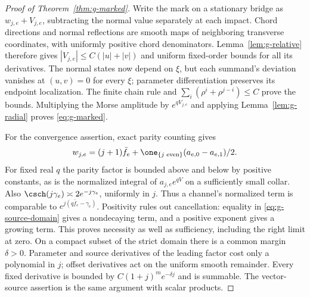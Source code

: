 \begin{proof}[Proof of Theorem~\ref{thm:g-marked}]
Write the mark on a stationary bridge as $w_{j,e}+V_{j,e}$, subtracting
the normal value separately at each impact. Chord directions and normal
reflections are smooth maps of neighboring transverse coordinates, with
uniformly positive chord denominators. Lemma~\ref{lem:g-relative}
therefore gives $|V_{j,e}|\le C(|u|+|v|)$ and uniform fixed-order
bounds for all its derivatives. The normal states now depend on $\xi$,
but each summand's deviation vanishes at $(u,v)=0$ for every $\xi$;
parameter differentiation preserves its endpoint localization.
The finite chain rule and $\sum_i(\rho^i+\rho^{j-i})\le C$ prove
the bounds. Multiplying the Morse amplitude by $e^{qV_{j,e}}$ and
applying Lemma~\ref{lem:g-radial} proves \eqref{eq:g-marked}.

For the convergence assertion, exact parity counting gives
\begin{equation}\label{eq:g-parity}
 w_{j,e}=(j+1)\bar f_e+
       \one_{\{j\text{ even}\}}(a_{e,0}-a_{e,1})/2.
\end{equation}
For fixed real $q$ the parity factor is bounded above and below by
positive constants, as is the normalized integral of $a_{j,e}e^{qV}$
on a sufficiently small collar. Also $\csch(j\gamma_e)\asymp
2e^{-j\gamma_e}$, uniformly in $j$. Thus a channel's normalized term
is comparable to $e^{j(q\bar f_e-\gamma_e)}$. Positivity rules out
cancellation: equality in \eqref{eq:g-source-domain} gives a
nondecaying term, and a positive exponent gives a growing term.
This proves necessity as well as sufficiency, including the right limit
at zero. On a compact subset of the strict domain there is a common
margin $\delta>0$. Parameter and source derivatives of the leading
factor cost only a polynomial in $j$; offset derivatives act on the
uniform smooth remainder. Every fixed derivative is bounded by
$C(1+j)^m e^{-\delta j}$ and is summable. The vector-source assertion
is the same argument with scalar products.
\end{proof}

